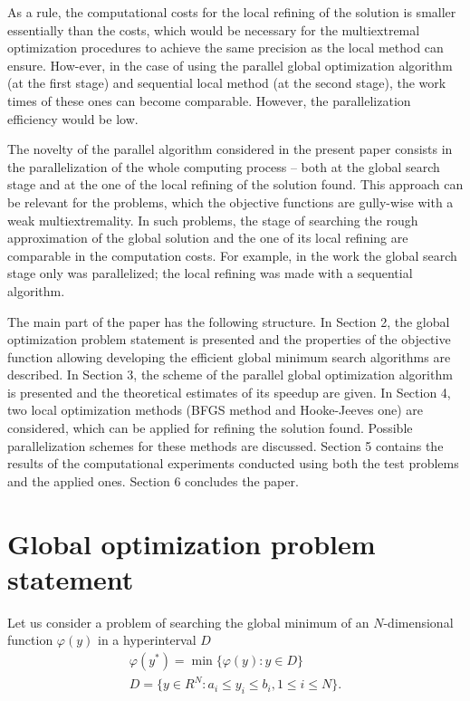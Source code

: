 \documentclass[runningheads]{llncs}
\begin{document}
As a rule, the computational costs for the local refining of the solution is smaller essentially than the costs, which would be necessary for the multiextremal optimization procedures to achieve the same precision as the local method can ensure. How-ever, in the case of using the parallel global optimization algorithm (at the first stage) and sequential local method (at the second stage), the work times of these ones can become comparable. However, the parallelization efficiency would be low.

The novelty of the parallel algorithm considered in the present paper consists in the parallelization of the whole computing process – both at the global search stage and at the one of the local refining of the solution found. This approach can be relevant for the problems, which the objective functions are gully-wise with a weak multiextremality. In such problems, the stage of searching the rough approximation of the global solution and the one of its local refining are comparable in the computation costs. For example, in the work \cite{Gubaydullin2021} the global search stage only was parallelized; the local refining was made with a sequential algorithm.

The main part of the paper has the following structure. In Section 2, the global optimization problem statement is presented and the properties of the objective function allowing developing the efficient global minimum search algorithms are described. In Section 3, the scheme of the parallel global optimization algorithm is presented and the theoretical estimates of its speedup are given. In Section 4, two local optimization methods (BFGS method and Hooke-Jeeves one) are considered, which can be applied for refining the solution found. Possible parallelization schemes for these methods are discussed. Section 5 contains the results of the computational experiments conducted using both the test problems and the applied ones. Section 6 concludes the paper.

\section{Global optimization problem statement}

Let us consider a problem of searching the global minimum of an $N$-dimensional function $\varphi(y)$ in a hyperinterval $D$
\begin{gather}
\varphi(y^*) = \min{\{ \varphi(y):y \in D \}} \label{problemN} \\ 
D = \{ y \in R^{N}: a_i \leq y_i \leq b_i, 1 \leq i \leq N \}. \label{D}
\end{gather}
\end{document}
